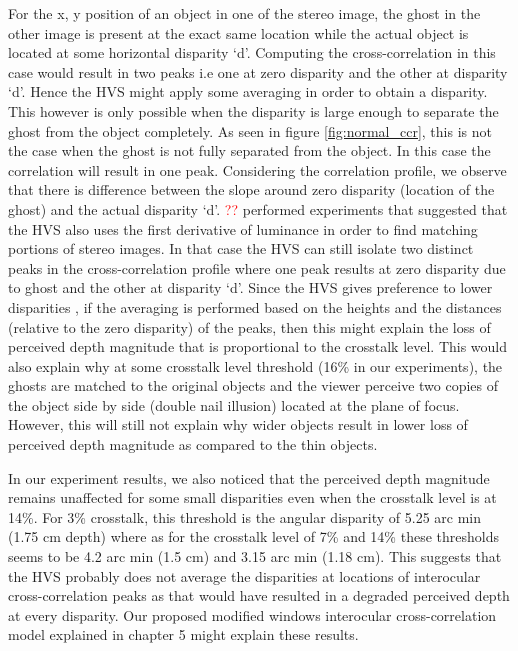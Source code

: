 For the x, y position of an object in one of the stereo image, the ghost in the other image is present at the exact same location while the actual object is located at some horizontal disparity `d'. Computing the cross-correlation in this case would result in two peaks i.e one at zero disparity and the other at disparity `d'. Hence the HVS might apply some averaging in order to obtain a disparity. This however is only possible when the disparity is large enough to separate the ghost from the object completely. As seen in figure \ref{fig:normal_ccr}, this is not the case when the ghost is not fully separated from the object. In this case the correlation will result in one peak. Considering the correlation profile, we observe that there is difference between the slope around zero disparity (location of the ghost) and the actual disparity `d'. \textcolor{red}{??} performed experiments that suggested that the HVS also uses the first derivative of luminance in order to find matching portions of stereo images. In that case the HVS can still isolate two distinct peaks in the cross-correlation profile where one peak results at zero disparity due to ghost and the other at disparity `d'. Since the HVS gives preference to lower disparities \cite{krol1980double}, if the averaging is performed based on the heights and the distances (relative to the zero disparity) of the peaks, then this might explain the loss of perceived depth magnitude that is proportional to the crosstalk level. This would also explain why at some crosstalk level threshold (16\% in our experiments), the ghosts are matched to the original objects and the viewer perceive two copies of the object side by side (double nail illusion) located at the plane of focus. However, this will still not explain why wider objects result in lower loss of perceived depth magnitude as compared to the thin objects.

In our experiment results, we also noticed that the perceived depth magnitude remains unaffected for some small disparities even when the crosstalk level is at 14\%. For 3\% crosstalk, this threshold is the angular disparity of 5.25 arc min (1.75 cm depth) where as for the crosstalk level of 7\% and 14\% these thresholds seems to be 4.2 arc min (1.5 cm) and 3.15 arc min (1.18 cm). This suggests that the HVS probably does not average the disparities at locations of interocular cross-correlation peaks as that would have resulted in a degraded perceived depth at every disparity. Our proposed modified windows interocular cross-correlation model explained in chapter 5 might explain these results.

